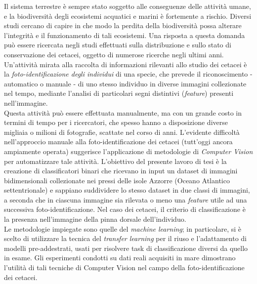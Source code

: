 \documentclass[a4paper,12pt,twoside]{book}
\newenvironment{abstract}%
{\cleardoublepage%
\thispagestyle{empty}%
\null \vfill\begin{center}%
\bfseries \abstractname \end{center}}%
{\vfill\null}
\begin{document}
\begin{frontespizio}
\Rientro{1.5cm}
\Preambolo{\renewcommand{\frontlogosep}{10pt}}
\end{frontespizio}

\begin{abstract}
Il sistema terrestre è sempre stato soggetto alle conseguenze delle attività umane, e la biodiversità degli ecosistemi acquatici e marini è fortemente a rischio. Diversi studi cercano di capire in che modo la perdita della biodiversità possa alterare l’integrità e il funzionamento di tali ecosistemi.  Una risposta a questa domanda può essere ricercata negli studi effettuati sulla distribuzione e sullo stato di conservazione dei cetacei, oggetto di numerose ricerche negli ultimi anni.\\
Un'attività mirata alla raccolta di informazioni rilevanti allo studio dei cetacei è la \textit{foto-identificazione degli individui} di una specie, che prevede il riconoscimento - automatico o manuale - di uno stesso individuo in diverse immagini collezionate nel tempo, mediante l’analisi di particolari segni distintivi (\emph{feature}) presenti nell'immagine.\\
Questa attività può essere effettuata manualmente, ma con un grande costo in termini di tempo per i ricercatori, che spesso hanno a disposizione diverse migliaia o milioni di fotografie, scattate nel corso di anni. L'evidente difficoltà nell'approccio manuale alla foto-identificazione dei cetacei (tutt'oggi ancora ampiamente operata) suggerisce l’applicazione di metodologie di \emph{Computer Vision} per automatizzare tale attività.
L’obiettivo del presente lavoro di tesi è la creazione di classificatori binari che ricevano in input un dataset di immagini bidimensionali collezionate nei pressi delle isole Azzorre (Oceano Atlantico settentrionale) e sappiano suddividere lo stesso dataset in due classi di immagini, a seconda che in ciascuna immagine sia rilevata o meno una \emph{feature} utile ad una successiva foto-identificazione. Nel caso dei cetacei, il criterio di classificazione è la presenza nell'immagine della pinna dorsale dell'individuo.\\
Le metodologie impiegate sono quelle del \emph{machine learning}; in particolare, si è scelto di utilizzare la tecnica del \emph{transfer learning} per il riuso e l'adattamento di modelli pre-addestrati, usati per risolvere task di classificazione diversi da quello in esame.
Gli esperimenti condotti su dati reali acquisiti in mare dimostrano l’utilità di tali tecniche di Computer Vision nel campo della foto-identificazione dei cetacei.
\end{abstract}
\end{document}
